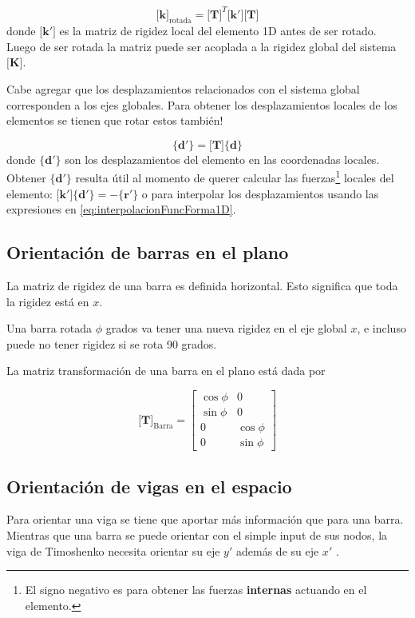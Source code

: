 \documentclass[11pt, a4paper,titlepage]{article}
\newcommand{\Mme}[1]{\boldsymbol{[}\mathbf{#1} \boldsymbol{]}}
\newcommand{\Cme}[1]{\boldsymbol{\{ }\mathbf{#1} \boldsymbol{\}} }
\newcommand{\MK}{\Mme{K}}
\newcommand{\Mk}{\Mme{k}}
\begin{document}
\begin{equation} \label{eq:rotacionElemento}
	\Mk_{\mathrm{rotada}}= \Mme{T}^T \Mme{k'} \Mme{T}
\end{equation}
donde $\Mme{k'} $ es la matriz de rigidez local del elemento 1D antes de ser rotado. Luego de ser rotada la matriz puede ser acoplada a la rigidez global del sistema $\MK$.

Cabe agregar que los desplazamientos relacionados con el sistema global corresponden a los ejes globales. Para obtener los desplazamientos locales de los elementos se tienen que rotar estos también!

\begin{equation} \label{eq:rotacionDesplazamientos}
\Cme{d'}= \Mme{T} \Cme{d}  
\end{equation}
donde $\Cme{d'}$ son los desplazamientos del elemento en las coordenadas locales. Obtener $\Cme{d'}$ resulta útil al momento de querer calcular las fuerzas\footnote{El signo negativo es para obtener las fuerzas \textbf{internas} actuando en el elemento.} locales del elemento: \( \Mme{k'}\Cme{d'}= - \Cme{r'} \) o para interpolar los desplazamientos usando las expresiones en \eqref{eq:interpolacionFuncForma1D}.

\subsection*{Orientación de barras en el plano} \label{sec:OrientacionBarras}
La matriz de rigidez de una barra es definida horizontal. Esto significa que toda la rigidez está en $x$.

Una barra rotada $\phi$ grados va tener una nueva rigidez en el eje global $x$, e incluso puede no tener rigidez si se rota 90 grados.

La matriz transformación de una barra en el plano está dada por 

\[
\Mme{T}_{\mathrm{Barra}}= \begin{bmatrix}
\cos \phi & 0 \\
\sin \phi & 0 \\
0 & \cos \phi \\
0 & \sin \phi
\end{bmatrix}
\]

\subsection*{Orientación de vigas en el espacio}
Para orientar una viga se tiene que aportar más información que para una barra. Mientras que una barra se puede orientar con el simple input de sus nodos, la viga de Timoshenko necesita orientar su eje $y'$ además de su eje $x'$ .
\end{document}
